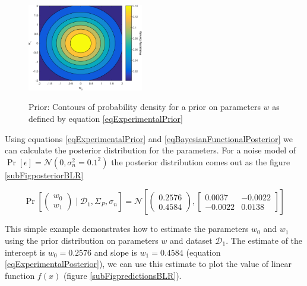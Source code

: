 \begin{figure}[!ht]
  \centering
            \includegraphics[width=0.45\textwidth]
        {images/part1/priorBLR}
        \label{subFigpriorBLR}
        \caption{Prior: Contours of probability density for a prior on parameters $w$ as defined by equation \ref{eqExperimentalPrior}}
\end{figure}

\begin{mdframed}[hidealllines=true,backgroundcolor=lightgray!20]
Using equations \ref{eqExperimentalPrior} and \ref{eqBayesianFunctionalPosterior} we can calculate the posterior distribution for the parameters. For a noise model of $\Pr[\epsilon] = \mathcal{N}(0, \sigma_{n}^2=0.1^2)$ the posterior distribution comes out as the figure \ref{subFigposteriorBLR}

\begin{equation}\label{eqExperimentalPosterior}
\Pr \left [\begin{pmatrix}
w_{0}\\ 
w_{1}
\end{pmatrix} \mid \mathcal{D}_{1}, \Sigma_{P}, \sigma_{n} \right ] = \mathcal{N}\left [ \begin{pmatrix}
0.2576\\ 
0.4584
\end{pmatrix}, \begin{bmatrix}
0.0037 & -0.0022\\ 
-0.0022 & 0.0138
\end{bmatrix} \right ]
\end{equation}

This simple example demonstrates how to estimate the parameters $w_{0}$ and $w_{1}$ using the prior distribution on parameters $w$ and dataset $\mathcal{D}_{1}$. The estimate of the intercept is $w_{0} = 0.2576$ and slope is $w_{1} = 0.4584$ (equation \ref{eqExperimentalPosterior}), we can use this estimate to plot the value of linear function $f(x)$ (figure \ref{subFigpredictionsBLR}). 
\end{mdframed}

